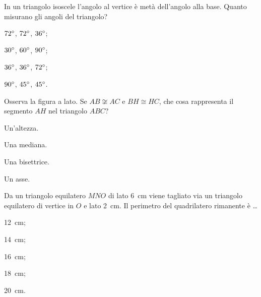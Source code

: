 \begin{esercizio}
\label{ese:2.98}
In un triangolo isoscele l'angolo al vertice è metà dell'angolo alla base. Quanto misurano gli angoli del triangolo?
\begin{multicols}{4}
\begin{enumeratea}
\item $72{}^{\circ}$, $72{}^{\circ}$, $36{}^{\circ}$;
\item $30{}^{\circ}$, $60{}^{\circ}$, $90{}^{\circ}$;
\item $36{}^{\circ}$, $36{}^{\circ}$, $72{}^{\circ}$;
\item $90{}^{\circ}$, $45{}^{\circ}$, $45{}^{\circ}$.
\end{enumeratea}
\end{multicols}
\end{esercizio}

\begin{esercizio}
\label{ese:2.99}
Osserva la figura a lato. Se $AB\not\cong AC$ e $BH\cong HC$, che cosa rappresenta il segmento $AH$ nel triangolo $ABC$?\\
\begin{minipage}{.5\linewidth}
\begin{enumeratea}
\item Un'altezza.
\item Una mediana.
\item Una bisettrice.
\item Un asse.
\end{enumeratea}
\end{minipage}\hfil
\begin{minipage}{.2\linewidth}
  \centering
    
\end{minipage}
\end{esercizio}


\begin{esercizio}
\label{ese:2.100}
Da un triangolo equilatero $MNO$ di lato 6~cm viene tagliato via un triangolo equilatero di vertice in $O$ e lato 2~cm. Il perimetro del quadrilatero rimanente è \ldots
\begin{multicols}{5}
\begin{enumeratea}
\item 12~cm;
\item 14~cm;
\item 16~cm;
\item 18~cm;
\item 20~cm.
\end{enumeratea}
\end{multicols}
\end{esercizio}
